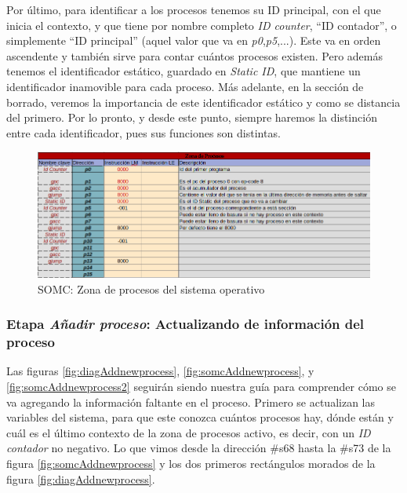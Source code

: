 \documentclass[letterpaper,12pt,oneside]{book}
\begin{document}
            Por último, para identificar a los procesos tenemos su ID principal, con el que
			inicia el contexto, y que tiene
			por nombre completo  \textit{ID counter}, ``ID contador'', o simplemente ``ID principal'' (aquel valor que va en \textit{p0},\textit{p5},...).
			 Este va en orden ascendente y también sirve para 
			contar cuántos procesos existen. Pero además tenemos el identificador
			estático, guardado en \textit{Static ID}, que mantiene un identificador inamovible para cada proceso.
			Más adelante, en la sección de borrado, veremos la importancia de este identificador
			estático y como se distancia del primero.
			 Por lo pronto, y desde este punto, siempre haremos la distinción entre cada identificador, pues sus funciones son distintas.		
			

			
		\begin{figure}[h]		
			\centering
			\includegraphics[scale=0.55]{media/CARDIACC/Zona_De_Procesos.png}
			\caption{SOMC: Zona de procesos del sistema operativo}
			\label{fig:somcZonaDeProcesos}
		\end{figure}

            \subsubsection{Etapa \textit{Añadir proceso}: Actualizando de información del proceso}
            
			Las figuras  \ref{fig:diagAddnewprocess}, \ref{fig:somcAddnewprocess}, y \ref{fig:somcAddnewprocess2} seguirán siendo
			nuestra guía para comprender cómo se va agregando la información faltante en el proceso. Primero se actualizan las variables del sistema, para 
			que este conozca cuántos procesos hay, dónde 
			están y cuál es el último
			contexto de la zona de procesos activo, es decir, con un \textit{ID contador} no negativo. Lo que vimos desde la dirección \#s68 hasta
			la \#s73 de la figura \ref{fig:somcAddnewprocess} y los dos primeros rectángulos morados de la figura \ref{fig:diagAddnewprocess}.
			
\end{document}
